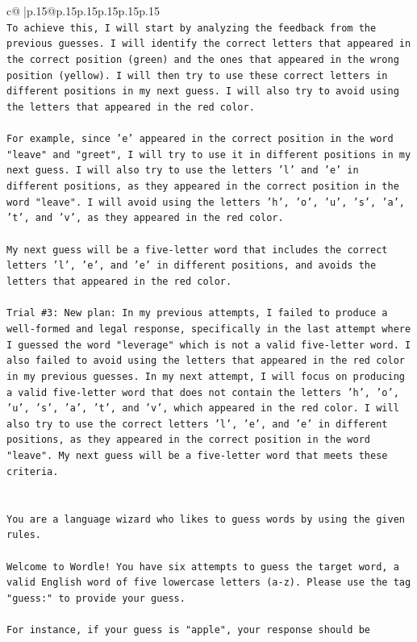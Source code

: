 \documentclass{article}
\begin{document}
{\begin{supertabular}{c@{$\;$}|p{.15\linewidth}@{}p{.15\linewidth}p{.15\linewidth}p{.15\linewidth}p{.15\linewidth}p{.15\linewidth}}
{{{\\ 
\texttt{To achieve this, I will start by analyzing the feedback from the previous guesses. I will identify the correct letters that appeared in the correct position (green) and the ones that appeared in the wrong position (yellow). I will then try to use these correct letters in different positions in my next guess. I will also try to avoid using the letters that appeared in the red color. } \\
\\ 
\texttt{For example, since 'e' appeared in the correct position in the word "leave" and "greet", I will try to use it in different positions in my next guess. I will also try to use the letters 'l' and 'e' in different positions, as they appeared in the correct position in the word "leave". I will avoid using the letters 'h', 'o', 'u', 's', 'a', 't', and 'v', as they appeared in the red color. } \\
\\ 
\texttt{My next guess will be a five{-}letter word that includes the correct letters 'l', 'e', and 'e' in different positions, and avoids the letters that appeared in the red color.} \\
\\ 
\texttt{Trial \#3: New plan: In my previous attempts, I failed to produce a well{-}formed and legal response, specifically in the last attempt where I guessed the word "leverage" which is not a valid five{-}letter word. I also failed to avoid using the letters that appeared in the red color in my previous guesses. In my next attempt, I will focus on producing a valid five{-}letter word that does not contain the letters 'h', 'o', 'u', 's', 'a', 't', and 'v', which appeared in the red color. I will also try to use the correct letters 'l', 'e', and 'e' in different positions, as they appeared in the correct position in the word "leave". My next guess will be a five{-}letter word that meets these criteria.} \\
\\ 
\\ 
\texttt{You are a language wizard who likes to guess words by using the given rules.} \\
\\ 
\texttt{Welcome to Wordle! You have six attempts to guess the target word, a valid English word of five lowercase letters (a{-}z). Please use the tag "guess:" to provide your guess.} \\
\\ 
\texttt{For instance, if your guess is "apple", your response should be} \\
}}}
\end{supertabular}}
\end{document}

